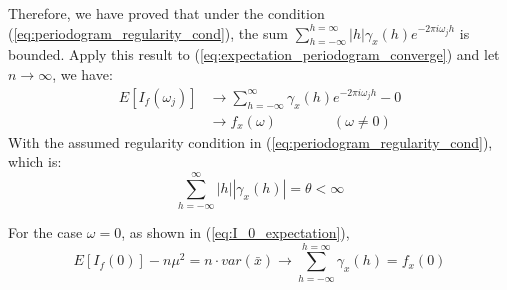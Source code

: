 Therefore, we have proved that under the condition (\ref{eq:periodogram_regularity_cond}), the sum $\sum_{h = -\infty}^{h = \infty} |h|\gamma_x(h)e^{-2\pi i \omega_j h}$ is bounded. Apply this result to (\ref{eq:expectation_periodogram_converge}) and let $n \rightarrow \infty$, we have:
\begin{equation}
\begin{split}
E[I_f(\omega_j)] &\rightarrow \sum_{h = -\infty}^{\infty} \gamma_x(h)e^{-2\pi i \omega_j h}  - 0 \\
&\rightarrow f_x(\omega) \qquad \qquad (\omega \neq 0)
\end{split}
\end{equation}
With the assumed regularity condition in (\ref{eq:periodogram_regularity_cond}), which is:
\begin{equation}
\sum_{h = - \infty}^{\infty} |h||\gamma_x(h)| = \theta < \infty
\end{equation}

For the case $\omega = 0$, as shown in (\ref{eq:I_0_expectation}), 
\begin{equation}
E[I_f(0)] - n\mu^2 = n\cdot var(\bar{x}) \rightarrow \sum_{h = -\infty}^{h = \infty}\gamma_x(h) = f_x(0)
\end{equation}
